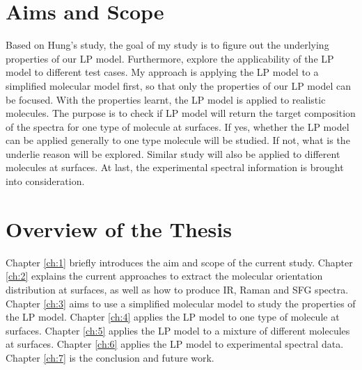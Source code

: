 \section{Aims and Scope}
Based on Hung's study, the goal of my study is to figure out the underlying properties of our LP model. Furthermore, explore the applicability of the LP model to different test cases. My approach is applying the LP model to a simplified molecular model first, so that only the properties of our LP model can be focused. With the properties learnt, the LP model is applied to realistic molecules. The purpose is to check if LP model will return the target composition of the spectra for one type of molecule at surfaces. If yes, whether the LP model can be applied generally to one type molecule will be studied. If not, what is the underlie reason will be explored. Similar study will also be applied to different molecules at surfaces. At last, the experimental spectral information is brought into consideration. \\

\section{Overview of the Thesis}
Chapter \ref{ch:1} briefly introduces the aim and scope of the current study. Chapter \ref{ch:2} explains the current approaches to extract the molecular orientation distribution at surfaces, as well as how to produce IR, Raman and SFG spectra. Chapter \ref{ch:3} aims to use a simplified molecular model to study the properties of the LP model. Chapter \ref{ch:4} applies the LP model to one type of molecule at surfaces. Chapter \ref{ch:5} applies the LP model to a mixture of different molecules at surfaces. Chapter \ref{ch:6} applies the LP model to experimental spectral data. Chapter \ref{ch:7} is the conclusion and future work.
